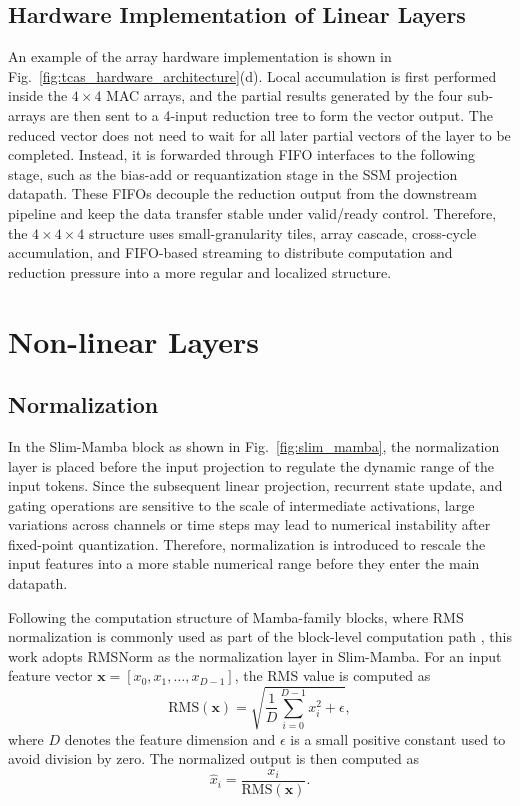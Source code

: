 \documentclass[11pt,twoside]{eitExjobb}
\begin{document}
\subsection{Hardware Implementation of Linear Layers}

An example of the array hardware implementation is shown in
Fig.~\ref{fig:tcas_hardware_architecture}(d). Local accumulation is first performed
inside the $4\times4$ MAC arrays, and the partial results generated by the four
sub-arrays are then sent to a 4-input reduction tree to form the vector output. The
reduced vector does not need to wait for all later partial vectors of the layer to be
completed. Instead, it is forwarded through FIFO interfaces to the following stage,
such as the bias-add or requantization stage in the SSM projection datapath. These FIFOs
decouple the reduction output from the downstream pipeline and keep the data transfer
stable under valid/ready control. Therefore, the $4\times4\times4$ structure uses
small-granularity tiles, array cascade, cross-cycle accumulation, and FIFO-based
streaming to distribute computation and reduction pressure into a more regular and
localized structure.

\section{Non-linear Layers}

\subsection{Normalization}
\label{subsec:normalization}

In the Slim-Mamba block as shown in Fig.~\ref{fig:slim_mamba}, the normalization layer 
is placed before the input projection to regulate the dynamic range of the input tokens. Since the subsequent
linear projection, recurrent state update, and gating operations are sensitive to the
scale of intermediate activations, large variations across channels or time steps may
lead to numerical instability after fixed-point quantization. Therefore, normalization
is introduced to rescale the input features into a more stable numerical range before
they enter the main datapath.

Following the computation structure of Mamba-family blocks, where RMS normalization is
commonly used as part of the block-level computation path
\cite{cite:LightMamba2025,cite:FastMamba2025}, this work adopts RMSNorm as the
normalization layer in Slim-Mamba. For an input feature vector
\(\mathbf{x}=[x_0,x_1,\ldots,x_{D-1}]\), the RMS value is computed as
\begin{equation}
\mathrm{RMS}(\mathbf{x}) =
\sqrt{
\frac{1}{D}
\sum_{i=0}^{D-1} x_i^2 + \epsilon
},
\label{eq:rms_value_hw}
\end{equation}
where \(D\) denotes the feature dimension and \(\epsilon\) is a small positive
constant used to avoid division by zero. The normalized output is then computed as
\begin{equation}
\hat{x}_i =
\frac{x_i}{\mathrm{RMS}(\mathbf{x})}.
\label{eq:rms_norm_hw}
\end{equation}
\end{document}
